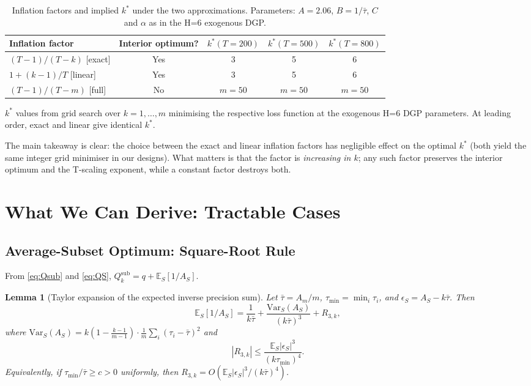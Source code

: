 \documentclass[12pt,a4paper]{article}
\newtheorem{lemma}{Lemma}
\theoremstyle{definition}
\newcommand{\Qsub}{Q_k^{\mathrm{sub}}}
\newcommand{\E}{\mathbb{E}}
\newcommand{\Var}{\mathrm{Var}}
\begin{document}
\begin{table}[ht]
\centering
\caption{Inflation factors and implied $k^*$ under the two approximations.
  Parameters: $A=2.06$, $B=1/\bar\tau$, $C$ and $\alpha$ as in the
  H=6 exogenous DGP.}
\label{tab:inflation_compare}
\begin{tabular}{lcccc}
\toprule
Inflation factor & Interior optimum? & $k^*(T=200)$ & $k^*(T=500)$ & $k^*(T=800)$ \\
\midrule
$(T-1)/(T-k)$ [exact]   & Yes & 3 & 5 & 6 \\
$1+(k-1)/T$ [linear]    & Yes & 3 & 5 & 6 \\
$(T-1)/(T-m)$ [full]    & No  & $m=50$ & $m=50$ & $m=50$ \\
\bottomrule
\end{tabular}
\footnotesize{$k^*$ values from grid search over $k=1,\ldots,m$ minimising the
respective loss function at the exogenous H=6 DGP parameters.
At leading order, exact and linear give identical $k^*$.}
\end{table}

The main takeaway is clear: the choice between the exact and linear inflation
factors has negligible effect on the optimal $k^*$ (both yield the same
integer grid minimiser in our designs).  What matters is that the factor is
\emph{increasing in $k$}; any such factor preserves the interior optimum and
the T-scaling exponent, while a constant factor destroys both.

\section{What We Can Derive: Tractable Cases}
\label{sec:tractable}

\subsection{Average-Subset Optimum: Square-Root Rule}
\label{sec:sub_sqrt}

From \eqref{eq:Qsub} and \eqref{eq:QS},
$\Qsub = q + \E_S[1/A_S]$.

\begin{lemma}[Taylor expansion of the expected inverse precision sum]\label{lem:taylor}
Let $\bar\tau=A_m/m$, $\tau_{\min}=\min_i\tau_i$, and
$\epsilon_S=A_S-k\bar\tau$.  Then
\begin{equation}\label{eq:taylor}
  \E_S[1/A_S] = \frac{1}{k\bar\tau}
  + \frac{\Var_S(A_S)}{(k\bar\tau)^3} + R_{3,k},
\end{equation}
where $\Var_S(A_S)=k\!\left(1-\frac{k-1}{m-1}\right)\!\cdot\!\frac{1}{m}\sum_i(\tau_i-\bar\tau)^2$ and
\begin{equation}\label{eq:taylor_remainder}
  |R_{3,k}|
  \le
  \frac{\E_S|\epsilon_S|^3}{(k\tau_{\min})^4}.
\end{equation}
Equivalently, if $\tau_{\min}/\bar\tau\ge c>0$ uniformly, then
$R_{3,k}=O\!\left(\E_S|\epsilon_S|^3/(k\bar\tau)^4\right)$.
\end{lemma}
\end{document}
